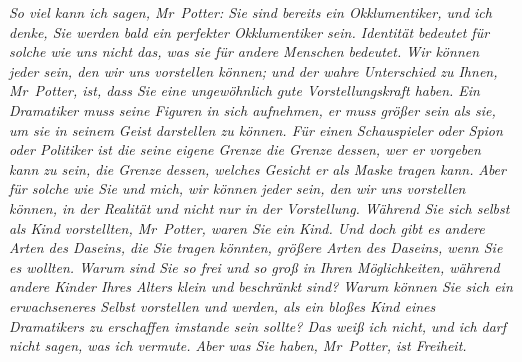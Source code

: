 \emph{So viel kann ich sagen, Mr~Potter: Sie sind bereits ein Okklumentiker, und ich denke, Sie werden bald ein perfekter Okklumentiker sein. Identität bedeutet für solche wie uns nicht das, was sie für andere Menschen bedeutet. Wir können jeder sein, den wir uns vorstellen können; und der wahre Unterschied zu Ihnen, Mr~Potter, ist, dass Sie eine ungewöhnlich gute Vorstellungskraft haben. Ein Dramatiker muss seine Figuren in sich aufnehmen, er muss größer sein als sie, um sie in seinem Geist darstellen zu können. Für einen Schauspieler oder Spion oder Politiker ist die seine eigene Grenze die Grenze dessen, wer er vorgeben kann zu sein, die Grenze dessen, welches Gesicht er als Maske tragen kann.}
\emph{Aber für solche wie Sie und mich, wir können jeder \emph{sein}, den wir uns vorstellen können, in der Realität und nicht nur in der Vorstellung. Während Sie sich selbst als Kind vorstellten, Mr~Potter, \emph{waren} Sie ein Kind. Und doch gibt es andere Arten des Daseins, die Sie tragen könnten, größere Arten des Daseins, wenn Sie es wollten. Warum sind Sie so frei und so groß in Ihren Möglichkeiten, während andere Kinder Ihres Alters klein und beschränkt sind? Warum können Sie sich ein erwachseneres Selbst vorstellen und \emph{werden}, als ein bloßes Kind eines Dramatikers zu erschaffen imstande sein sollte? Das weiß ich nicht, und ich darf nicht sagen, was ich vermute. Aber was Sie haben, Mr~Potter, ist Freiheit.}


